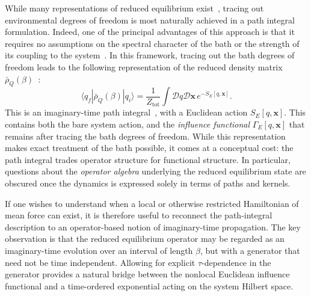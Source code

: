 \documentclass[aps,prl,twocolumn,superscriptaddress,showpacs,floatfix]{revtex4-2}
\begin{document}
While many representations of reduced equilibrium exist~\cite{weissQuantumDissipativeSystems2012, breuerTheoryOpenQuantum2002, grabertQuantumBrownianMotion1988}, tracing out environmental degrees of freedom is most naturally achieved in a path integral formulation. Indeed, one of the principal advantages of this approach is that it requires no assumptions on the spectral character of the bath or the strength of its coupling to the system~\cite{weissQuantumDissipativeSystems2012}. In this framework, tracing out the bath degrees of freedom leads to the following representation of the reduced density matrix $\bar{\rho}_Q(\beta)$~\cite{feynmanQuantumMechanicsPath1965, kleinertPathIntegralsQuantum2009}:
\begin{equation}
    \langle q_f|\bar{\rho}_Q(\beta)|q_i\rangle = \frac{1}{Z_{\mathrm{tot}}} \int \mathcal{D}q \mathcal{D}\mathbf{x} \, e^{-S_E[q,\mathbf{x}]}.
\end{equation}
This is an imaginary-time path integral~\cite{feynmanQuantumMechanicsPath1965, kleinertPathIntegralsQuantum2009}, with a Euclidean action $S_E[q,\mathbf{x}]$. This contains both the bare system action, and the \emph{influence functional} $\Gamma_E[q,\mathbf{x}]$ that remains after tracing the bath degrees of freedom. While this representation makes exact treatment of the bath possible, it comes at a conceptual cost: the path
integral trades operator structure for functional structure. In particular,
questions about the \emph{operator algebra} underlying the reduced equilibrium
state are obscured once the dynamics is expressed solely in terms of paths and
kernels.

If one wishes to understand when a local or otherwise restricted Hamiltonian of
mean force can exist, it is therefore useful to reconnect the path-integral
description to an operator-based notion of imaginary-time propagation. The key
observation is that the reduced equilibrium operator may be regarded as an
imaginary-time evolution over an interval of length $\beta$, but with a generator
that need not be time independent. Allowing for explicit $\tau$-dependence in
the generator provides a natural bridge between the nonlocal Euclidean influence
functional and a time-ordered exponential acting on the system Hilbert space.
\end{document}
